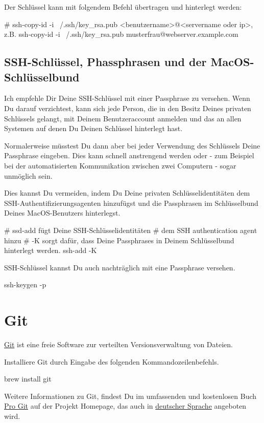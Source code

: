 \documentclass[]{article}
\begin{document}
Der Schlüssel kann mit folgendem Befehl übertragen und hinterlegt werden:
\begin{bashcode}
# ssh-copy-id -i ~/.ssh/key_rsa.pub <benutzername>@<servername oder ip>, z.B.
ssh-copy-id -i ~/.ssh/key_rsa.pub musterfrau@webserver.example.com
\end{bashcode}

\subsection{SSH-Schlüssel, Phassphrasen und der MacOS-Schlüsselbund}
Ich empfehle Dir Deine SSH-Schlüssel mit einer Passphrase zu versehen. Wenn Du darauf verzichtest, kann sich jede Person, die in den Besitz Deines privaten Schlüssels gelangt, mit Deinem Benutzeraccount anmelden und das an allen Systemen auf denen Du Deinen Schlüssel hinterlegt hast.

Normalerweise müsstest Du dann aber bei jeder Verwendung des Schlüssels Deine Passphrase eingeben. Dies kann schnell anstrengend werden oder - zum Beispiel bei der automatisierten Kommunikation zwischen zwei Computern - sogar unmöglich sein.

Dies kannst Du vermeiden, indem Du Deine privaten Schlüsselidentitäten dem SSH-Authentifizierungsagenten hinzufügst und die Passphrasen im Schlüsselbund Deines MacOS-Benutzers hinterlegst. 

\begin{bashcode}
# ssd-add fügt Deine SSH-Schlüsselidentitäten
# dem SSH authentication agent hinzu
# -K sorgt dafür, dass Deine Passphrases in Deinem Schlüsselbund hinterlegt werden.
ssh-add -K
\end{bashcode}

SSH-Schlüssel kannst Du auch nachträglich mit eine Passphrase versehen.
\begin{bashcode}
ssh-keygen -p
\end{bashcode}

\section{Git}
\href{https://git-scm.com/}{Git} ist eine freie Software zur verteilten Versionsverwaltung von Dateien.

Installiere Git durch Eingabe des folgenden Kommandozeilenbefehls.
\begin{bashcode}
brew install git
\end{bashcode}

Weitere Informationen zu Git, findest Du im umfassenden und kostenlosen Buch \href{https://git-scm.com/book/en/v2}{Pro Git} auf der Projekt Homepage, das auch in \href{https://git-scm.com/book/de/v2/}{deutscher Sprache} angeboten wird.
\end{document}
